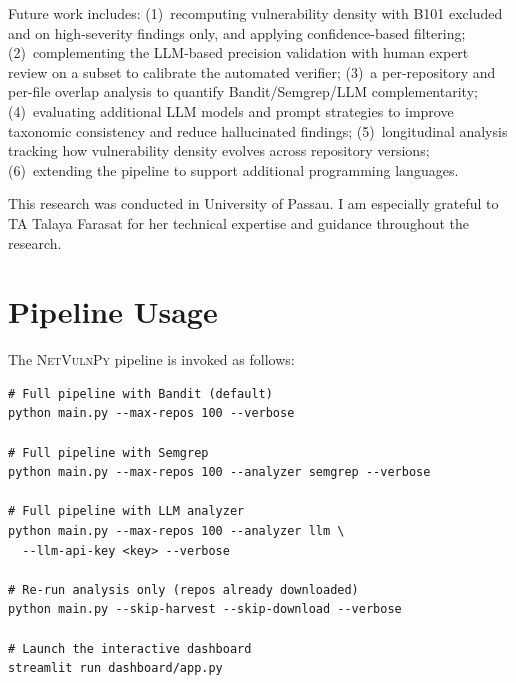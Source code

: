 \documentclass[sigconf,authordraft]{acmart}
\begin{document}
Future work includes: (1)~recomputing vulnerability density with B101
excluded and on high-severity findings only, and applying
confidence-based filtering; (2)~complementing the LLM-based precision
validation with human expert review on a subset to calibrate the
automated verifier; (3)~a per-repository and per-file overlap analysis
to quantify Bandit/Semgrep/LLM complementarity; (4)~evaluating
additional LLM models and prompt strategies to improve taxonomic
consistency and reduce hallucinated findings; (5)~longitudinal
analysis tracking how vulnerability density evolves across repository
versions; (6)~extending the pipeline to support additional programming
languages.

\begin{acks}
This research was conducted in University of Passau. I am especially grateful to TA Talaya Farasat for her technical expertise and guidance throughout the research.

\end{acks}





\appendix

\section{Pipeline Usage}
\label{app:usage}

The \textsc{NetVulnPy} pipeline is invoked as follows:

\begin{verbatim}
# Full pipeline with Bandit (default)
python main.py --max-repos 100 --verbose

# Full pipeline with Semgrep
python main.py --max-repos 100 --analyzer semgrep --verbose

# Full pipeline with LLM analyzer
python main.py --max-repos 100 --analyzer llm \
  --llm-api-key <key> --verbose

# Re-run analysis only (repos already downloaded)
python main.py --skip-harvest --skip-download --verbose

# Launch the interactive dashboard
streamlit run dashboard/app.py
\end{verbatim}


\end{document}
